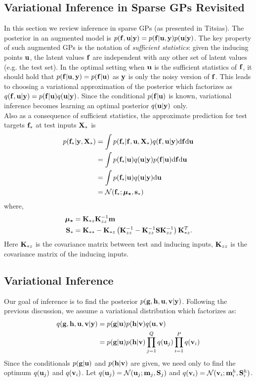 \documentclass{article} %
\begin{document}
\subsection{Variational Inference in Sparse GPs Revisited}
In this section we review inference in sparse GPs (as presented in Titsias).
The posterior in an augmented model is $p(\mathbf{f}, \mathbf{u} | \mathbf{y}) = p(\mathbf{f} | \mathbf{u}, \mathbf{y}) p(\mathbf{u} | \mathbf{y})$.
The key property of such augmented GPs  is the notation of \textit{sufficient statistics}: given the inducing points $\mathbf{u}$, the latent values $\mathbf{f}$ are independent with any other set of latent values (e.g. the test set).
In the optimal setting when $\mathbf{u}$ is the sufficient statistics of $\mathbf{f}$, it should hold that $p(\mathbf{f} | \mathbf{u}, \mathbf{y}) = p(\mathbf{f} | \mathbf{u})$ as $\mathbf{y}$ is only the noisy version of $\mathbf{f}$.
This leads to choosing a variational approximation of the posterior which factorizes as $q(\mathbf{f}, \mathbf{u} | \mathbf{y}) = p(\mathbf{f} | \mathbf{u}) q(\mathbf{u} | \mathbf{y})$.
Since the conditional $p(\mathbf{f} | \mathbf{u})$ is known, variational inference becomes learning an optimal posterior $q(\mathbf{u} | \mathbf{y})$ only. \\

\noindent Also as a consequence of sufficient statistics, the approximate prediction for test targets $\mathbf{f}_*$ at test inputs $\mathbf{X}_*$ is
\begin{align}
\nonumber
p(\mathbf{f}_* | \mathbf{y}, \mathbf{X}_*) &= \int p(\mathbf{f}_* | \mathbf{f}, \mathbf{u}, \mathbf{X}_*) q(\mathbf{f}, \mathbf{u} | \mathbf{y}) \mathrm{d} \mathbf{f} \mathrm{d} \mathbf{u} \\
\nonumber
&= \int p(\mathbf{f}_* | \mathbf{u}) q(\mathbf{u}| \mathbf{y}) p(\mathbf{f} | \mathbf{u}) \mathrm{d} \mathbf{f} \mathrm{d} \mathbf{u} \\ \nonumber
&= \int p(\mathbf{f}_* | \mathbf{u}) q(\mathbf{u}| \mathbf{y}) \mathrm{d} \mathbf{u} \\
\label{eq:sorprediction}
&= \mathcal{N}(\mathbf{f}_*; \boldsymbol{\mu_*},\mathbf{s_*})
\end{align}
where,
\begin{align}
\nonumber
\boldsymbol{\mu_*} &= \mathbf{K}_{*z} \mathbf{K}_{zz}^{-1}\mathbf{m} \\ 
\nonumber
\mathbf{S}_* &= \mathbf{K}_{**} - \mathbf{K}_{*z} \left(\mathbf{K}_{zz}^{-1} - \mathbf{K}_{zz}^{-1} \mathbf{S} \mathbf{K}_{zz}^{-1} \right) \mathbf{K}_{*z}^T.
\end{align}
 Here $\mathbf{K}_{*z}$ is the covariance matrix between test and inducing inputs, $\mathbf{K}_{zz}$ is the covariance matrix of the inducing inputs.

\subsection{Variational Inference}
\newcommand{\ug}{\u_g}
\newcommand{\uh}{\u^h}
\newcommand{\mgj}{\m_j}
\newcommand{\mhi}{\m^h_i}
\newcommand{\Sgj}{\S_j}
\newcommand{\Shi}{\S^h_i}
Our goal of inference is to find the posterior $p(\mathbf{g}, \mathbf{h}, \mathbf{u}, \mathbf{v} | \mathbf{y})$. 
Following the previous discussion, we assume a variational distribution which factorizes as:
\begin{align}
\nonumber
q(\mathbf{g}, \mathbf{h}, \mathbf{u}, \mathbf{v} | \mathbf{y})
\nonumber
 &= p(\mathbf{g}|\mathbf{u}) p(\mathbf{h}|\mathbf{v}) q(\mathbf{u},\mathbf{v})  \\
 &= p(\mathbf{g}|\mathbf{u}) p(\mathbf{h}|\mathbf{v}) \prod_{j=1}^Q q(\mathbf{u}_j) \prod_{i=1}^P  q(\mathbf{v}_i)
\end{align}
Since the conditionals $p(\mathbf{g} | \mathbf{u})$ and $p(\mathbf{h} | \mathbf{v})$ are given, we need only to find the optimum $q(\mathbf{u}_j)$ and $q(\mathbf{v}_i)$.
Let $q(\u_j) = \Normal(\u_j; \mgj, \Sgj)$ and $q(\v_i) = \Normal(\v_i; \mhi, \Shi)$. \\
\end{document}
